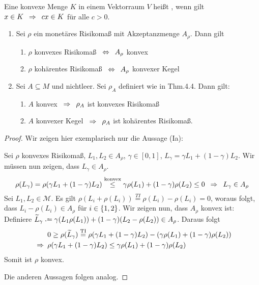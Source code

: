 \begin{*definition}
	Eine konvexe Menge $K$ in einem Vektorraum $V$ heißt , wenn gilt $x \in K \enskip \Rightarrow \enskip c x \in K$ für alle $c > 0$.
\end{*definition}

\begin{theorem}
	\begin{enumerate}[label=\Roman*., leftmargin=*, nolistsep]
		\item Sei $\rho$ ein monetäres Risikomaß mit Akzeptanzmenge $A_\rho$. Dann gilt
		\begin{enumerate}[label=(\alph*)]
			\item $\rho$ konvexes Risikomaß $\enskip \Leftrightarrow \enskip A_\rho$ konvex
			\item $\rho$ kohärentes Risikomaß $\enskip \Leftrightarrow \enskip A_\rho$ konvexer Kegel
		\end{enumerate} 
		\item Sei $A \subseteq M$ und nichtleer. Sei $\rho_A$ definiert wie in Thm.4.4. Dann gilt:
		\begin{enumerate}[label=(\alph*)]
			\item $A$ konvex $\enskip \Rightarrow \enskip \rho_A$ ist konvexes Risikomaß
			\item $A$ konvexer Kegel $\enskip \Rightarrow \enskip \rho_A$ ist kohärentes Risikomaß.
		\end{enumerate}
	\end{enumerate}
\end{theorem}
\begin{proof}
	Wir zeigen hier exemplarisch nur die Aussage (Ia):
	\begin{equivalence}
		\hinrichtung Sei $\rho$ konvexes Risikomaß, $L_1, L_2 \in A_\rho$, $\gamma \in [0,1]$, $L_\gamma = \gamma L_1 + (1-\gamma) L_2$. Wir müssen nun zeigen, dass $L_\gamma \in A_\rho$.
		\begin{equation*}
			\rho(L_\gamma) = \rho(\gamma L_1 + (1-\gamma) L_2) \overset{\text{konvex}}{\le} \gamma \rho(L_1) + (1-\gamma) \rho(L_2) \le 0 \enskip \Rightarrow \enskip L_\gamma \in A_\rho
		\end{equation*}
		\rueckrichtung Sei $L_1, L_2 \in \mathcal{M}$. Es gilt $\rho(L_i + \rho(L_i)) \overset{TI}{=} \rho(L_i) - \rho(L_i) = 0$, woraus folgt, dass $L_i - \rho(L_i) \in A_\rho$ für $i \in \left\{ 1,2 \right\}$. Wir zeigen nun, dass $A_\rho$ konvex ist: Definiere $\schlange{L}_\gamma \defeq \gamma(L_1  \rho(L_1)) + (1-\gamma)(L_2 - \rho(L_2)) \in A_\rho$. Daraus folgt
		\begin{equation*}
			\begin{aligned}
			&0 \ge \rho(\widetilde{L}_\gamma) \overset{\text{TI}}{=} \rho(\gamma L_1 + (1-\gamma) L_2) - \left( \gamma \rho(L_1) + (1-\gamma)\rho(L_2) \right) \\
			\enskip \Rightarrow \enskip &\rho(\gamma L_1 + (1-\gamma) L_2) \le \gamma \rho(L_1) + (1-\gamma) \rho(L_2)
			\end{aligned}
		\end{equation*}
		Somit ist $\rho$ konvex.
	\end{equivalence}
	Die anderen Aussagen folgen analog.
\end{proof}

